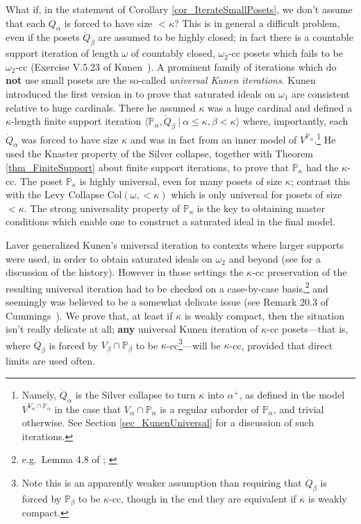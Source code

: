 \documentclass{amsart}
\begin{document}
What if, in the statement of Corollary \ref{cor_IterateSmallPosets}, we don't assume that each $\dot{Q}_\alpha$ is forced to have size $<\kappa$?  This is in general a difficult problem, even if the posets $\dot{Q}_\beta$ are assumed to be highly closed; in fact there is a countable support iteration of length $\omega$ of countably closed, $\omega_2$-cc posets which fails to be $\omega_2$-cc (Exercise V.5.23 of Kunen~\cite{MR2905394}).  A prominent family of iterations which do \textbf{not} use small posets are the so-called \emph{universal Kunen iterations}.  Kunen introduced the first version in \cite{MR495118} to prove that saturated ideals on $\omega_1$ are consistent relative to huge cardinals.  There he assumed $\kappa$ was a huge cardinal and defined a $\kappa$-length finite support iteration $\langle \mathbb{P}_\alpha, \dot{Q}_\beta \ | \ \alpha \le \kappa, \beta < \kappa \rangle$ where, importantly, each $\dot{Q}_\alpha$ was forced to have size $\kappa$ and was in fact from an inner model of $V^{\mathbb{P}_\alpha}$.\footnote{Namely, $\dot{Q}_\alpha$ is the Silver collapse to turn $\kappa$ into $\alpha^+$, as defined in the model $V^{V_\alpha \cap \mathbb{P}_\alpha}$ in the case that $V_\alpha \cap \mathbb{P}_\alpha$ is a regular suborder of $\mathbb{P}_\alpha$, and trivial otherwise.  See Section \ref{sec_KunenUniversal} for a discussion of such iterations.}  He used the Knaster property of the Silver collapse, together with Theorem \ref{thm_FiniteSupport} about finite support iterations, to prove that $\mathbb{P}_\kappa$ had the $\kappa$-cc.  The poset $\mathbb{P}_\kappa$ is highly universal, even for many posets of size $\kappa$; contrast this with the Levy Collapse $\text{Col}(\omega, < \kappa)$ which is only universal for posets of size $<\kappa$.  The strong universality property of $\mathbb{P}_\kappa$ is the key to obtaining master conditions which enable one to construct a saturated ideal in the final model.


Laver generalized Kunen's universal iteration to contexts where larger supports were used, in order to obtain saturated ideals on $\omega_2$ and beyond (see \cite{MattHandbook} for a discussion of the history).  However in those settings the $\kappa$-cc preservation of the resulting universal iteration had to be checked on a case-by-case basis,\footnote{e.g.\ Lemma 4.8 of \cite{MR2151585}; \cite{MR662045} } and seemingly was believed to be a somewhat delicate issue (see Remark 20.3 of Cummings~\cite{MR2768691}).   We prove that, at least if $\kappa$ is weakly compact, then the situation isn't really delicate at all; \textbf{any} universal Kunen iteration of $\kappa$-cc posets---that is, where $\dot{Q}_\beta$ is forced by $V_\beta \cap \mathbb{P}_\beta$ to be $\kappa$-cc\footnote{Note this is an apparently weaker assumption than requiring that $\dot{Q}_\beta$ is forced by $\mathbb{P}_\beta$ to be $\kappa$-cc, though in the end they are equivalent if $\kappa$ is weakly compact. }---will be $\kappa$-cc, provided that direct limits are used often.  
\end{document}
